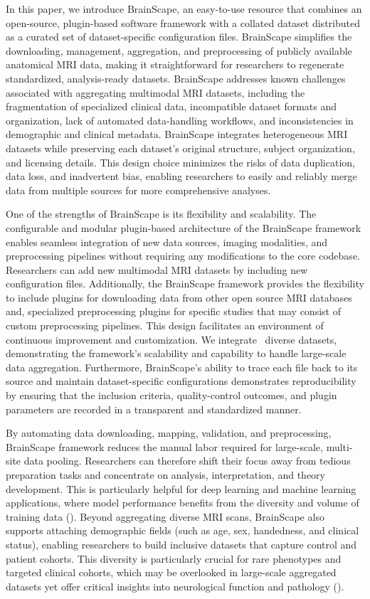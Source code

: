 In this paper, we introduce BrainScape, an easy-to-use resource that combines an open-source, 
plugin-based software framework with a collated dataset distributed as a curated set of 
dataset-specific configuration files.
BrainScape simplifies the downloading, management, aggregation, and preprocessing of publicly available anatomical MRI data, 
making it straightforward for researchers to regenerate standardized, analysis-ready datasets.
BrainScape addresses known challenges associated with aggregating multimodal MRI datasets, 
including the fragmentation of specialized clinical data, incompatible dataset formats and organization, 
lack of automated data-handling workflows, and inconsistencies in demographic and clinical metadata.
BrainScape integrates heterogeneous MRI datasets while preserving each dataset's original structure, 
subject organization, and licensing details.
This design choice minimizes the risks of data duplication, data loss, and inadvertent bias, 
enabling researchers to easily and reliably merge data from multiple sources 
for more comprehensive analyses.

One of the strengths of BrainScape is its flexibility and scalability. 
The configurable and modular plugin-based architecture of the BrainScape framework enables 
seamless integration of new data sources, imaging modalities, and preprocessing pipelines without requiring any modifications to the core codebase.
Researchers can add new multimodal MRI datasets by including new configuration files. 
Additionally, the BrainScape framework provides the flexibility to include plugins for downloading data from other open source MRI databases and, 
specialized preprocessing plugins for specific studies that may consist of custom preprocessing pipelines.
This design facilitates an environment of continuous improvement and customization.
We integrate \NumDatasets\ diverse datasets, demonstrating the framework's scalability 
and capability to handle large-scale data aggregation.
Furthermore, BrainScape's ability to trace each file back to its source and maintain 
dataset-specific configurations demonstrates reproducibility by ensuring that the inclusion criteria, 
quality-control outcomes, and plugin parameters are recorded in a transparent and standardized manner.

By automating data downloading, mapping, validation, and preprocessing, BrainScape framework reduces the 
manual labor required for large-scale, multi-site data pooling. Researchers can therefore shift 
their focus away from tedious preparation tasks and concentrate on analysis, interpretation, and theory development. 
This is particularly helpful for deep learning and machine learning applications, where model 
performance benefits from the diversity and volume of training data (\cite{dishner2024survey}). Beyond aggregating diverse MRI scans, 
BrainScape also supports attaching demographic fields (such as age, sex, handedness, and clinical status), enabling 
researchers to build inclusive datasets that capture control and patient cohorts. 
This diversity is particularly crucial for rare phenotypes and targeted clinical cohorts, 
which may be overlooked in large-scale aggregated datasets yet offer critical insights into neurological function and pathology (\cite{thompson2014enigma}).


